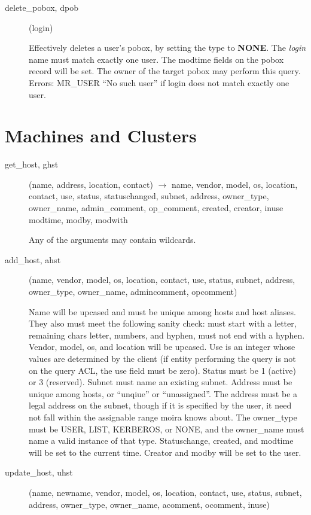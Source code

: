 \begin{description}
\item[delete\_pobox, dpob](login)

Effectively deletes a user's pobox, by setting the type to {\bf NONE}.
The {\em login} name must match exactly one user.  The modtime fields on
the pobox record will be set.  The owner of the target pobox may
perform this query.  Errors: MR\_USER ``No such user'' if login does not
match exactly one user.

\end{description}

\section{Machines and Clusters}

\begin{description}
\item[get\_host, ghst](name, address, location, contact) $\rightarrow$ name,
vendor, model, os, location, contact, use, status, statuschanged,
subnet, address, owner\_type, owner\_name, admin\_comment, op\_comment,
created, creator, inuse modtime, modby, modwith

Any of the arguments may contain wildcards.

\item[add\_host, ahst](name, vendor, model, os, location, contact, use,
status, subnet, address, owner\_type, owner\_name, admincomment,
opcomment)

Name will be upcased and must be unique among hosts and host aliases.
They also must meet the following sanity check: must start with a
letter, remaining chars letter, numbers, and hyphen, must not end with
a hyphen.  Vendor, model, os, and location will be upcased.  Use is an
integer whose values are determined by the client (if entity
performing the query is not on the query ACL, the use field must be
zero).  Status must be 1 (active) or 3 (reserved).  Subnet must name
an existing subnet.  Address must be unique among hosts, or ``unqiue''
or ``unassigned''.  The address must be a legal address on the subnet,
though if it is specified by the user, it need not fall within the
assignable range moira knows about.  The owner\_type must be USER,
LIST, KERBEROS, or NONE, and the owner\_name must name a valid instance
of that type.  Statuschange, created, and modtime will be set to the
current time.  Creator and modby will be set to the user.

\item[update\_host, uhst](name, newname, vendor, model, os, location,
contact, use, status, subnet, address, owner\_type, owner\_name,
acomment, ocomment, inuse)


\end{description}
